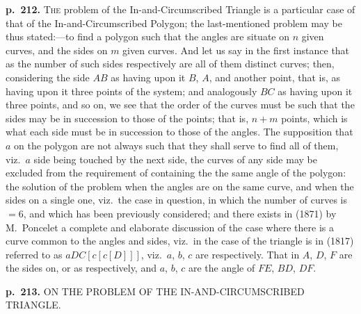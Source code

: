 \documentclass[11pt,a4paper]{article}
\begin{document}
\noindent
\textbf{p.~212.}  \textsc{The} problem of the In-and-Circumscribed Triangle is a particular case of that of
the In-and-Circumscribed Polygon; the last-mentioned problem may be thus stated:---to
find a polygon such that the angles are situate on $n$ given curves, and the sides on
$m$ given curves.  And let us say in the first instance that as the number of such
sides respectively are all of them distinct curves; then, considering the side $AB$ as
having upon it $B$, $A$, and another point, that is, as having upon it three points of
the system; and analogously $BC$ as having upon it three points, and so on, we see
that the order of the curves must be such that the sides may be in succession to
those of the points; that is, $n + m$ points, which is what each side must be in succession
to those of the angles.  The supposition that $a$ on the polygon are not always such
that they shall serve to find all of them, viz.\ $a$ side being touched by the next side,
the curves of any side may be excluded from the requirement of containing the
the same angle of the polygon: the solution of the problem when the angles are on
the same curve, and when the sides on a single one, viz.\ the case in question, in
which the number of curves is $= 6$, and which has been previously considered;
and there exists in (1871) by M.~Poncelet a complete and elaborate discussion of the
case where there is a curve common to the angles and sides, viz.\ in the case of the
triangle is in (1817) referred to as $aDC[c[c[D]]]$, viz.\ $a$, $b$, $c$ are respectively. That
in $A$, $D$, $F$ are the sides on, or as respectively, and $a$, $b$, $c$ are the angle of $FE$, $BD$, $DF$.

\clearpage

\noindent
\textbf{p.~213.}  ON THE PROBLEM OF THE IN-AND-CIRCUMSCRIBED TRIANGLE.
\end{document}
